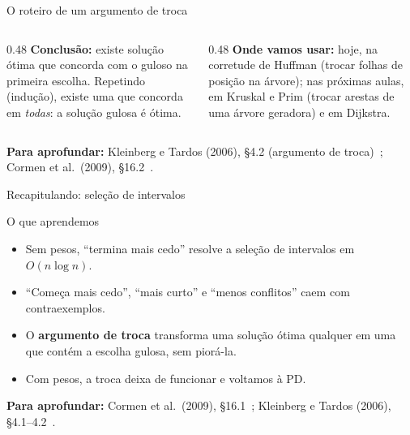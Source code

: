 \documentclass[aspectratio=169,xcolor=table]{beamer}
\newcommand{\fonte}[1]{%
  \vfill
  {\tiny\color{gray!55!black}\textbf{Para aprofundar:} #1\par}%
}
\begin{document}
\begin{frame}{O roteiro de um argumento de troca}
  \begin{center}
  \end{center}
  \medskip
  \begin{columns}[T]
    \begin{column}{0.48\textwidth}
      \scriptsize
      \textbf{Conclusão:} existe solução ótima que concorda com o guloso na primeira escolha.
      Repetindo (indução), existe uma que concorda em \emph{todas}: a solução gulosa é ótima.
    \end{column}
    \begin{column}{0.48\textwidth}
      \scriptsize
      \textbf{Onde vamos usar:} hoje, na corretude de Huffman (trocar folhas de posição na
      árvore); nas próximas aulas, em Kruskal e Prim (trocar arestas de uma árvore geradora)
      e em Dijkstra.
    \end{column}
  \end{columns}
  \fonte{Kleinberg e Tardos (2006), \S 4.2 (argumento de troca)~\cite{kleinberg2006algorithm};
    Cormen et al.\ (2009), \S 16.2~\cite{cormen2009introduction}.}
\end{frame}

\begin{frame}{Recapitulando: seleção de intervalos}
  \begin{block}{O que aprendemos}
    \begin{itemize}
      \item Sem pesos, ``termina mais cedo'' resolve a seleção de intervalos em
            $O(n \log n)$.
      \item ``Começa mais cedo'', ``mais curto'' e ``menos conflitos'' caem com
            contraexemplos.
      \item O \textbf{argumento de troca} transforma uma solução ótima qualquer em uma que
            contém a escolha gulosa, sem piorá-la.
      \item Com pesos, a troca deixa de funcionar e voltamos à PD.
    \end{itemize}
  \end{block}
  \fonte{Cormen et al.\ (2009), \S 16.1~\cite{cormen2009introduction};
    Kleinberg e Tardos (2006), \S 4.1--4.2~\cite{kleinberg2006algorithm}.}
\end{frame}
\end{document}
